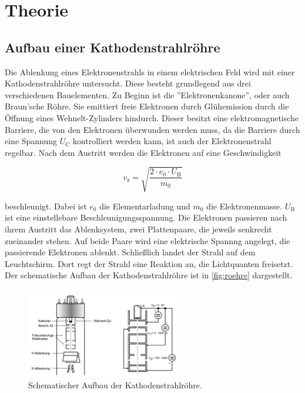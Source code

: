 \section{Theorie}
\label{sec:Theorie}




\subsection{Aufbau einer Kathodenstrahlröhre}
\label{ssec:t1}

Die Ablenkung eines Elektronenstrahls in einem elektrischen Feld wird mit einer Kathodenstrahlröhre untersucht.
Diese besteht grundlegend aus drei verschiedenen Bauelementen.
Zu Beginn ist die ''Elektronenkanone'', oder auch Braun'sche Röhre. Sie emittiert freie Elektronen durch Glühemission durch die Öffnung eines Wehnelt-Zylinders hindurch.
Dieser besitzt eine elektromagnetische Barriere, die von den Elektronen überwunden werden muss, da die Barriere durch eine Spannung $U_\text{C}$ kontrolliert werden kann, ist auch der Elektronenstrahl regelbar.
Nach dem Austritt werden die Elektronen auf eine Geschwindigkeit 

\begin{equation}
    v_\text{z} = \sqrt{\frac{2 \cdot e_0 \cdot U_\text{B}}{m_0}}
    \label{eq:zges}
\end{equation}

beschleunigt.
Dabei ist $e_0$ die Elementarladung und $m_0$ die Elektronenmasse. 
$U_\text{B}$ ist eine einstellebare Beschleunigungsspannung.
Die Elektronen passieren nach ihrem Austritt das Ablenksystem, zwei Plattenpaare, die jeweils senkrecht zueinander stehen.
Auf beide Paare wird eine elektrische Spannng angelegt, die passierende Elektronen ablenkt.
Schließlich landet der Strahl auf dem Leuchtschirm.
Dort regt der Strahl eine Reaktion an, die Lichtquanten freisetzt.
Der schematische Aufbau der Kathodenstrahlröhre ist in \autoref{fig:roehre} dargestellt.

\begin{figure}
    \centering
    \includegraphics[width=0.6\textwidth]{images/bild1.png}
    \caption{Schematischer Aufbau der Kathodenstrahlröhre.}
    \label{fig:roehre}
\end{figure}

